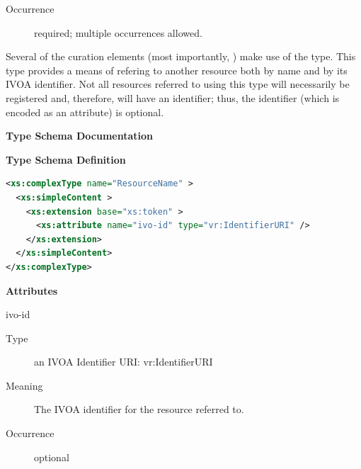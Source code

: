 \documentclass[11pt,a4paper]{ivoa}
\begin{document}
\begin{generated}
\begin{bigdescription}
\begin{description}
\item[Occurrence] required; multiple occurrences allowed.

\end{description}


\end{bigdescription}\endgroup

\endgroup
\end{generated}


Several of the curation elements (most importantly,
\/) make use of the
 type.  This type provides a means of
refering to another resource both by name and by its IVOA
identifier.  Not all resources referred to using this type will
necessarily be registered and, therefore, will have an identifier;
thus, the identifier (which is encoded as an attribute) is optional. 


\begin{generated}
\begingroup
      	\renewcommand*\descriptionlabel[1]{%
      	\hbox to 5.5em{\emph{#1}\hfil}}\vspace{2ex}\noindent\textbf{ Type Schema Documentation}


\vspace{1ex}\noindent\textbf{ Type Schema Definition}

\begin{lstlisting}[language=XML,basicstyle=\footnotesize]
<xs:complexType name="ResourceName" >
  <xs:simpleContent >
    <xs:extension base="xs:token" >
      <xs:attribute name="ivo-id" type="vr:IdentifierURI" />
    </xs:extension>
  </xs:simpleContent>
</xs:complexType>
\end{lstlisting}

\vspace{0.5ex}\noindent\textbf{ Attributes}

\begingroup\small\begin{bigdescription}
\item[ivo-id]
\begin{description}
\item[Type] an IVOA Identifier URI: vr:IdentifierURI
\item[Meaning] 
                The IVOA identifier for the resource referred to.
              
\item[Occurrence] optional

\end{description}


\end{bigdescription}\endgroup

\endgroup
\end{generated}
\end{document}
